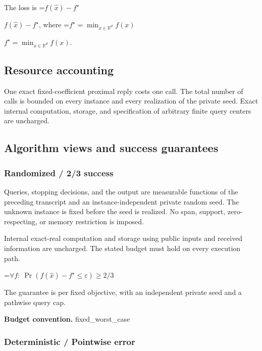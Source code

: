 \documentclass[10pt,a4paper]{article}
\newcommand{\AtlasMath}[1]{\par\begingroup\centering\setbox0=\hbox{$\displaystyle #1$}\ifdim\wd0>1.4\linewidth\typeout{ATLAS WIDE FORMULA: \the\wd0}\fi\ifdim\wd0>\linewidth\resizebox{\linewidth}{!}{\box0}\else\box0\fi\par\endgroup}
\newcommand{\AtlasInlineMath}[1]{\begingroup\setbox0=\hbox{$#1$}\ifdim\wd0>.4\linewidth\endgroup\AtlasMath{#1}\else\endgroup$#1$\fi}
\begin{document}
The loss is \AtlasInlineMath{f(\widehat x)-f^\star}, where \AtlasInlineMath{f^\star=\min_{x\in\mathbb R^d}f(x)}.



\subsection{Resource accounting}


One exact fixed-coefficient proximal reply costs one call. The total number of calls is bounded on every instance and every realization of the private seed. Exact internal computation, storage, and specification of arbitrary finite query centers are uncharged.



\subsection{Algorithm views and success guarantees}


\subsubsection{Randomized / 2/3 success}


Queries, stopping decisions, and the output are measurable functions of the preceding transcript and an instance-independent private random seed. The unknown instance is fixed before the seed is realized. No span, support, zero-respecting, or memory restriction is imposed.



Internal exact-real computation and storage using public inputs and received information are uncharged. The stated budget must hold on every execution path.




\AtlasMath{\forall f:\ \Pr(f(\widehat x)-f^\star\le\varepsilon)\ge2/3}




The guarantee is per fixed objective, with an independent private seed and a pathwise query cap.



\textbf{Budget convention.} fixed\_worst\_case



\subsubsection{Deterministic / Pointwise error}
\end{document}

